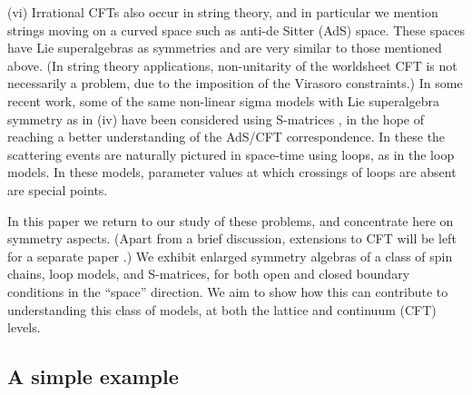 \documentclass[twocolumn,floats,pra]{revtex4}
\begin{document}
(vi) Irrational CFTs also occur in string theory, and in
particular we mention strings moving on a curved space such as
anti-de Sitter (AdS) space. These spaces have Lie superalgebras as
symmetries and are very similar to those mentioned above. (In
string theory applications, non-unitarity of the worldsheet CFT is
not necessarily a problem, due to the imposition of the Virasoro
constraints.) In some recent work, some of the same non-linear
sigma models with Lie superalgebra symmetry as in (iv) have been
considered using S-matrices \cite{polchinski}, in the hope of
reaching a better understanding of the AdS/CFT correspondence. In
these the scattering events are naturally pictured in space-time
using loops, as in the loop models. In these models, parameter
values at which crossings of loops are absent are special points.


In this paper we return to our study of these problems, and
concentrate here on symmetry aspects. (Apart from a brief
discussion, extensions to CFT will be left for a separate paper
\cite{rs3}.) We exhibit enlarged symmetry algebras of a class of
spin chains, loop models, and S-matrices, for both open and closed
boundary conditions in the ``space'' direction. We aim to show how
this can contribute to understanding this class of models, at both
the lattice and continuum (CFT) levels.

\subsection{A simple example}
\end{document}
